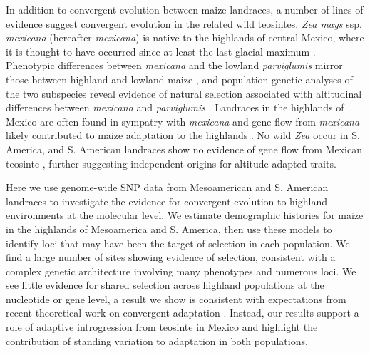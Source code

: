 In addition to convergent evolution between maize landraces, a number of lines of evidence suggest convergent evolution in the related wild teosintes.  
\emph{Zea mays} ssp. \emph{mexicana} (hereafter \emph{mexicana}) is native to the highlands of central Mexico, where it is thought to have occurred since at least the last glacial maximum \cite[]{Ross-Ibarra_2009_19153259, Hufford_niche}. 
Phenotypic differences between \emph{mexicana} and the lowland \emph{parviglumis} mirror those between highland and lowland maize \cite[]{Lauter_2004_15342532}, and population genetic analyses of the two subspecies reveal evidence of natural selection associated with altitudinal differences between \emph{mexicana} and \emph{parviglumis} \cite[]{Pyhajarvi2013,fang2012megabase}.  
Landraces in the highlands of Mexico are often found in sympatry with \emph{mexicana} and gene flow from \emph{mexicana} likely contributed to maize adaptation to the highlands \cite[]{Profford_2013}. 
No wild \emph{Zea} occur in S. America, and S. American landraces show no evidence of gene flow from Mexican teosinte \cite[]{vanHeerwaarden_2011_21189301}, 
further suggesting independent origins for altitude-adapted traits.

Here we use genome-wide SNP data from Mesoamerican and S. American landraces to investigate the evidence for convergent evolution to highland environments at the molecular level.  
We estimate demographic histories for maize in the highlands of Mesoamerica and S. America, then use these models to identify loci that may have been the target of selection in each population.
We find a large number of sites showing evidence of selection, consistent with a complex genetic architecture involving many phenotypes and numerous loci.  
We see little evidence for shared selection across highland populations at the nucleotide or gene level, a result we show is consistent with expectations from recent theoretical work on convergent adaptation \cite[]{ralph2014convergent}.
Instead, our results support a role of adaptive introgression from teosinte in Mexico and highlight the contribution of standing variation to adaptation in both populations.
